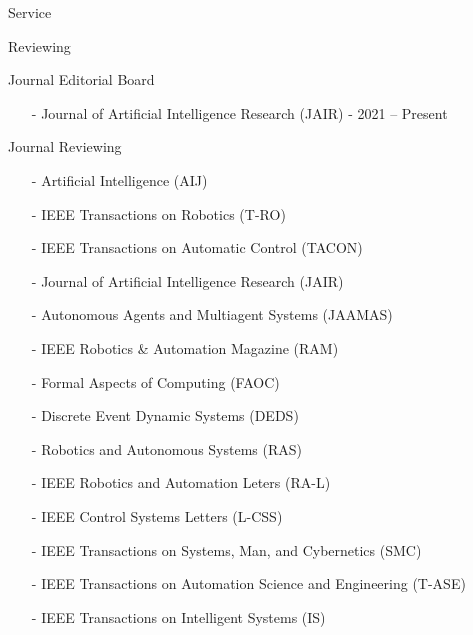 \begin{rSection}{Service}
\begin{rSubsection}{Reviewing}{}{}{}
\item Journal Editorial Board
\begin{itemize}
\vspace*{-0.2cm}
\item[-] Journal of Artificial Intelligence Research (JAIR) - 2021 -- Present 
\end{itemize}

\item Journal Reviewing
\begin{itemize}
\vspace*{-0.2cm}
\item[-]  Artificial Intelligence (AIJ)\vspace*{-0.2cm}
\item[-]  IEEE Transactions on Robotics (T-RO)\vspace*{-0.2cm}
\item[-]  IEEE Transactions on Automatic Control (TACON)\vspace*{-0.2cm}
\item[-] Journal of Artificial Intelligence Research (JAIR)\vspace*{-0.2cm}
\item[-] Autonomous Agents and Multiagent Systems (JAAMAS)\vspace*{-0.2cm}
\item[-]  IEEE Robotics \& Automation Magazine (RAM)\vspace*{-0.2cm}
\item[-] Formal Aspects of Computing (FAOC) \vspace*{-0.2cm}
\item[-]  Discrete Event Dynamic Systems (DEDS)\vspace*{-0.2cm}
\item[-] Robotics and Autonomous Systems (RAS)\vspace*{-0.2cm}
\item[-]   IEEE Robotics and Automation Leters (RA-L)\vspace*{-0.2cm}
\item[-]   IEEE Control Systems Letters (L-CSS)\vspace*{-0.2cm}
\item[-]  IEEE Transactions on Systems, Man, and Cybernetics (SMC)\vspace*{-0.2cm}
\item[-]  IEEE Transactions on Automation Science and Engineering (T-ASE)\vspace*{-0.2cm}
\item[-]  IEEE Transactions on Intelligent Systems (IS)\vspace*{-0.2cm}

\end{itemize}
\end{rSubsection}
\end{rSection}
